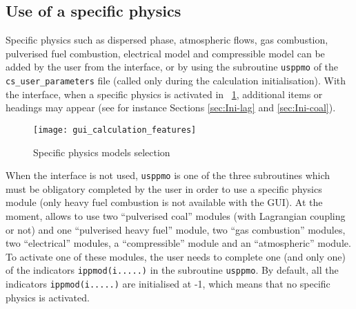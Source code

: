{{\subsection{Use of a specific physics}
\label{sec:prg_usppmo}%
Specific physics such as dispersed phase, atmospheric flows, gas combustion,
pulverised fuel combustion, electrical model and compressible model can be
added by the user from the interface, or by using the subroutine \texttt{usppmo} of
the \texttt{cs\_user\_parameters} file (called only during the calculation initialisation).
With the interface, when a specific physics is activated in \figurename~\ref{fig:5_GUI},
additional items or headings may appear (see for instance Sections \ref{sec:Ini-lag}
and \ref{sec:Ini-coal}).

\begin{figure}[!ht]
\begin{center}
\texttt{[image: gui\_calculation\_features]}
\caption{Specific physics models selection}
\label{fig:5_GUI}
\end{center}
\end{figure}

When the interface is not used, \texttt{usppmo} is one of the three subroutines
which must be obligatory completed by the user in order to use a specific physics module
(only heavy fuel combustion is not available with the GUI).
At the moment, \CS allows to use two ``pulverised coal'' modules
(with Lagrangian coupling or not) and one ``pulverised heavy fuel'' module,
two ``gas combustion'' modules, two ``electrical'' modules,
a ``compressible'' module and an ``atmospheric'' module. To activate one of
these modules, the user needs to complete one (and only one) of the
indicators \texttt{ippmod(i.....)} in the subroutine
\texttt{usppmo}. By default, all the indicators \texttt{ippmod(i.....)} are
initialised at -1, which means that no specific physics is activated.

}}
